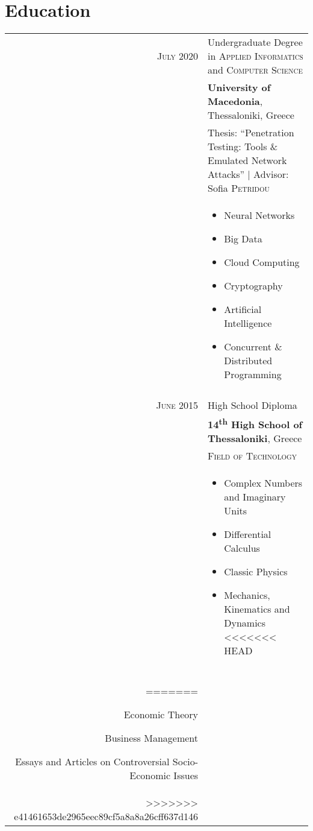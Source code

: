 \documentclass[a4paper,10pt]{article}
\begin{document}
{\section{Education}
\begin{tabular}{rp{11cm}}	
\textsc{July} 2020& Undergraduate Degree in \textsc{Applied Informatics} and \textsc{Computer Science} \\& \normalsize\textbf{University of Macedonia}, Thessaloniki, Greece\\
& Thesis: ``Penetration Testing: Tools \& Emulated Network Attacks'' | \small Advisor: Sofia \textsc{Petridou}\\
&\normalsize
\begin{itemize}
    \item Neural Networks
    \item Big Data
    \item Cloud Computing
    \item Cryptography
    \item Artificial Intelligence
    \item Concurrent \& Distributed Programming
\end{itemize} \\ \\
\textsc{June} 2015 & High School Diploma \\& \textbf{14\textsuperscript{th} High School of Thessaloniki}, Greece\\
&\textsc{Field of Technology}\\&
\begin{itemize}
    \item Complex Numbers and Imaginary Units
    \item Differential Calculus
    \item Classic Physics
    \item Mechanics, Kinematics and Dynamics
<<<<<<< HEAD

\end{itemize}
\\ \\
=======
    \item Economic Theory
    \item Business Management
    \item Essays and Articles on Controversial Socio-Economic Issues
\end{itemize}
\\
>>>>>>> e41461653de2965eec89cf5a8a8a26cff637d146
\end{tabular}

}
\end{document}
